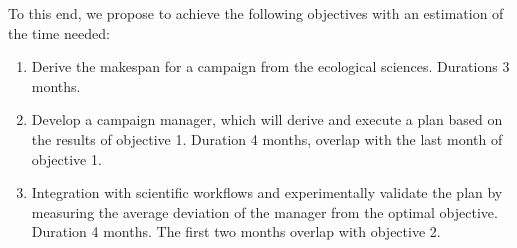 To this end, we propose to achieve the following objectives with an estimation of the time needed:
\begin{enumerate}
    \item Derive the makespan for a campaign from the ecological sciences. Durations 3 months.
    \item Develop a campaign manager, which will derive and execute a plan based on the results of objective 1. Duration 4 months, overlap with the last month of objective 1.
    \item Integration with scientific workflows and experimentally validate the plan by measuring the average deviation of the manager from the optimal objective. Duration 4 months. The first two months overlap with objective 2.
\end{enumerate}


